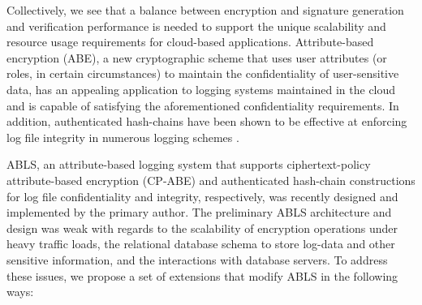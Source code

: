 \documentclass{sig-alternate}
\begin{document}
Collectively, we see that a balance between encryption and signature generation and verification performance is
needed to support the unique scalability and resource usage requirements for cloud-based applications.
Attribute-based encryption (ABE), a new cryptographic scheme that uses user attributes (or roles, in certain 
circumstances) to maintain the confidentiality of user-sensitive data, has an appealing application
to logging systems maintained in the cloud and is capable of satisfying the aforementioned confidentiality 
requirements. In addition, authenticated hash-chains have been shown to be effective at enforcing log file integrity
in numerous logging schemes  \cite{Schneier1999-Secure}. 

ABLS, an attribute-based logging system that supports ciphertext-policy attribute-based encryption (CP-ABE) \cite{Bethencourt2007-CPABE} 
and authenticated hash-chain constructions for log file confidentiality and integrity, respectively, was recently designed and implemented
by the primary author.  The preliminary ABLS architecture and design was weak with regards to the 
scalability of encryption operations under heavy traffic loads,
the relational database schema to store log-data and other sensitive information, and the interactions 
with database servers. To address these issues,
we propose a set of extensions that modify ABLS in the following ways:
\end{document}
